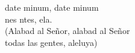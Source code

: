 \begin{cancion}%
	date minum, date minum\\
	nes ntes, ela.\\
(Alabad al Señor, alabad al Señor\\
 todas las gentes, aleluya)\\
\end{cancion}%

